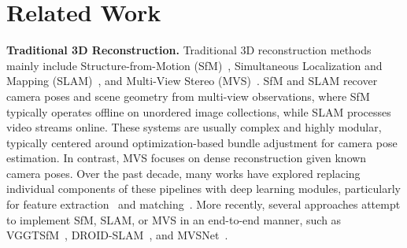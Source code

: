 \section{Related Work}
\label{sec:related}

\noindent\textbf{Traditional 3D Reconstruction.}
Traditional 3D reconstruction methods mainly include Structure-from-Motion (SfM)~\cite{snavely2006photo, schonberger2016structure, pan2024global}, Simultaneous Localization and Mapping (SLAM)~\cite{mur2015orb,mur2017orb,campos2021orb}, and Multi-View Stereo (MVS)~\cite{furukawa2009accurate,schonberger2016pixelwise,yao2018mvsnet}. SfM and SLAM recover camera poses and scene geometry from multi-view observations, where SfM typically operates offline on unordered image collections, while SLAM processes video streams online. These systems are usually complex and highly modular, typically centered around optimization-based bundle adjustment for camera pose estimation. In contrast, MVS focuses on dense reconstruction given known camera poses. Over the past decade, many works have explored replacing individual components of these pipelines with deep learning modules, particularly for feature extraction~\cite{detone2018superpoint} and matching~\cite{sarlin2020superglue,sun2021loftr}. More recently, several approaches attempt to implement SfM, SLAM, or MVS in an end-to-end manner, such as VGGTSfM~\cite{wang2024vggsfm}, DROID-SLAM~\cite{teed2021droid}, and MVSNet~\cite{yao2018mvsnet,yao2019recurrent}.


